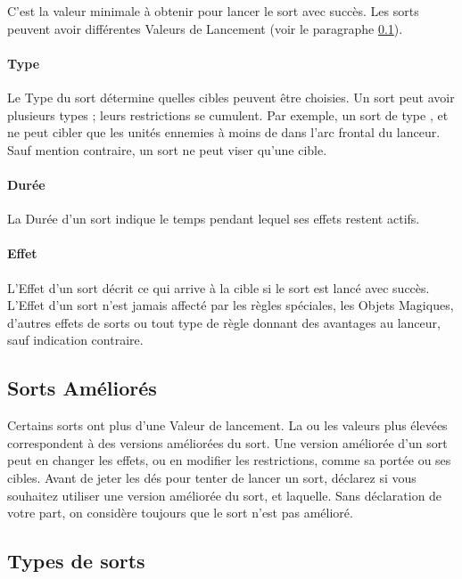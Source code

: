 C'est la valeur minimale à obtenir pour lancer le sort avec succès. Les sorts peuvent avoir différentes Valeurs de Lancement (voir le paragraphe \ref{boosted_spells}).

\paragraph{Type}

Le Type du sort détermine quelles cibles peuvent être choisies. Un sort peut avoir plusieurs types ; leurs restrictions se cumulent. Par exemple, un sort de type , \hex{} et \direct{} ne peut cibler que les unités ennemies à moins de  dans l'arc frontal du lanceur. Sauf mention contraire, un sort ne peut viser qu'une cible.

\paragraph{Durée}

La Durée d'un sort indique le temps pendant lequel ses effets restent actifs.

\paragraph{Effet}

L'Effet d'un sort décrit ce qui arrive à la cible si le sort est lancé avec succès. L'Effet d'un sort n'est jamais affecté par les règles spéciales, les Objets Magiques, d'autres effets de sorts ou tout type de règle donnant des avantages au lanceur, sauf indication contraire.

\subsection{Sorts Améliorés}
\label{boosted_spells}

Certains sorts ont plus d'une Valeur de lancement. La ou les valeurs plus élevées correspondent à des versions améliorées du sort. Une version améliorée d'un sort peut en changer les effets, ou en modifier les restrictions, comme sa portée ou ses cibles. Avant de jeter les dés pour tenter de lancer un sort, déclarez si vous souhaitez utiliser une version améliorée du sort, et laquelle. Sans déclaration de votre part, on considère toujours que le sort n'est pas amélioré.

\newpage
\subsection{Types de sorts}
\label{spell_types}

